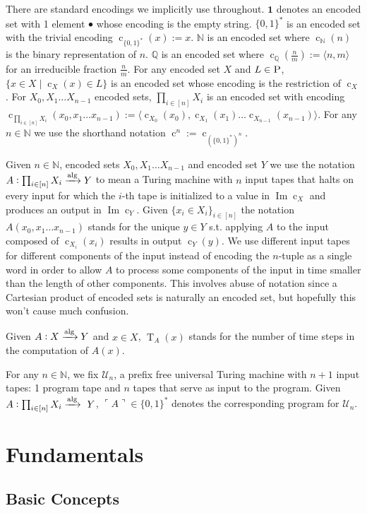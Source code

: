 \documentclass{article}
\numberwithin{equation}{section}
\theoremstyle{definition}
\theoremstyle{plain}
\newcommand{\Bool}{\{0,1\}}
\newcommand{\Words}{{\Bool^*}}
\DeclareMathOperator{\Img}{Im}
\DeclareMathOperator{\T}{T}
\DeclareMathOperator{\En}{c}
\newcommand{\Nats}{\mathbb{N}}
\newcommand{\Rats}{\mathbb{Q}}
\newcommand{\Chev}[1]{\langle #1 \rangle}
\newcommand{\Quote}[1]{\ulcorner #1 \urcorner}
\newcommand{\Alg}{\xrightarrow{\textnormal{alg}}}
\begin{document}
There are standard encodings we implicitly use throughout. $\bm{1}$ denotes an encoded set with 1 element $\bullet$ whose encoding is the empty string. $\Words$ is an encoded set with the trivial encoding ${\En_\Words(x):=x}$. $\Nats$ is an encoded set where $\En_\Nats(n)$ is the binary representation of $n$. $\Rats$ is an encoded set where ${\En_\Rats(\frac{n}{m}):=\Chev{n,m}}$ for an irreducible fraction $\frac{n}{m}$. For any encoded set $X$ and $L \in \textsc{P}$, $\{x \in X \mid \En_X(x) \in L\}$ is an encoded set whose encoding is the restriction of $\En_X$. For $X_0,X_1 \ldots X_{n-1}$ encoded sets, $\prod_{i \in [n]} X_i$ is an encoded set with encoding $\En_{\prod_{i \in [n]} X_i}(x_0,x_1 \ldots x_{n-1}):=\Chev{\En_{X_0}(x_0),\En_{X_1}(x_1) \ldots \En_{X_{n-1}}(x_{n-1})}$. For any $n \in \Nats$ we use the shorthand notation $\En^n:=\En_{(\Words)^n}$.

Given $n \in \Nats$, encoded sets $X_0, X_1 \ldots X_{n-1}$ and encoded set $Y$ we use the notation ${A: \prod_{i \in [n]} X_i \Alg Y}$ to mean a Turing machine with $n$ input tapes that halts on every input for which the $i$-th tape is initialized to a value in $\Img \En_X$ and produces an output in $\Img \En_Y$. Given $\{x_i \in X_i\}_{i \in [n]}$ the notation $A(x_0, x_1 \ldots x_{n-1})$ stands for the unique $y \in Y$ s.t. applying $A$ to the input composed of $\En_{X_i}(x_i)$ results in output $\En_Y(y)$. We use different input tapes for different components of the input instead of encoding the $n$-tuple as a single word in order to allow $A$ to process some components of the input in time smaller than the length of other components. This involves abuse of notation since a Cartesian product of encoded sets is naturally an encoded set, but hopefully this won't cause much confusion.

Given $A: X \Alg Y$ and $x \in X$, $\T_A(x)$ stands for the number of time steps in the computation of $A(x)$.

For any $n \in \Nats$, we fix $\mathcal{U}_n$, a prefix free universal Turing machine with $n+1$ input tapes: 1 program tape and $n$ tapes that serve as input to the program. Given $A: \prod_{i \in [n]} X_i \Alg\ Y$, $\Quote{A} \in \Words$ denotes the corresponding program for $\mathcal{U}_n$.

\section{Fundamentals}
\label{sec:fundamentals}

\subsection{Basic Concepts}
\end{document}
